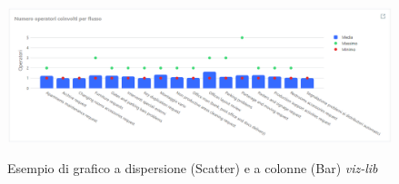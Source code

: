 \begin{figure}[H]
    \centering
    \includegraphics[alt={Esempio di grafico con a dispersione (Scatter) e colonne viz-lib}, width=1 \columnwidth, height=\maxdimen, keepaspectratio]{img/ex_scatter_bar.png}
    \caption{Esempio di grafico a dispersione (Scatter) e a colonne (Bar) \textit{viz-lib}}
    \label{fig:scatter-example}
\end{figure}

